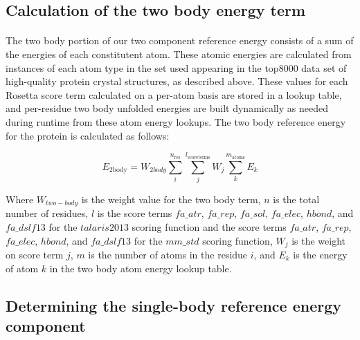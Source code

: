 \subsection{Calculation of the two body energy term}
\paragraph{}
The two body portion of our two component reference energy consists of a sum of the energies of each constitutent atom.
These atomic energies are calculated from instances of each atom type in the set used appearing in the top8000 data set of high-quality protein crystal structures, as described above.
These values for each Rosetta score term calculated on a per-atom basis are stored in a lookup table, and per-residue two body unfolded energies are built dynamically as needed during runtime from these atom energy lookups.
The two body reference energy for the protein is calculated as follows:

\begin{equation}
E_{\text{2body}} = W_{2body} \sum_{i}^{n_{\text{res}}} \sum_{j}^{l_{\text{scoreterms}}} W_{j} \sum_{k}^{m_{\text{atoms}}} E_{k}
\end{equation}

Where $W_{two-body}$ is the weight value for the two body term, $n$ is the total number of residues, $l$ is the score terms $fa\_atr$, $fa\_rep$, $fa\_sol$, $fa\_elec$, $hbond$, and $fa\_dslf13$ for the $talaris2013$ scoring function and the score terms $fa\_atr$, $fa\_rep$, $fa\_elec$, $hbond$, and $fa\_dslf13$ for the $mm\_std$ scoring function, $W_{j}$ is the weight on score term $j$, $m$ is the number of atoms in the residue $i$, and $E_{k}$ is the energy of atom $k$ in the two body atom energy lookup table.


\subsection{Determining the single-body reference energy component}

